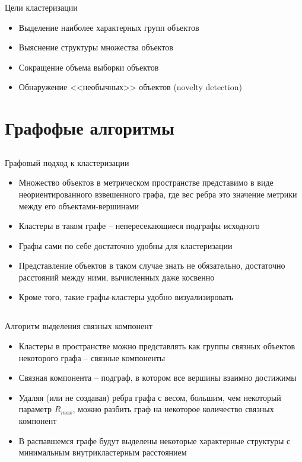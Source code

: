 \documentclass[compress,unicode]{beamer}
\begin{document}
\begin{frame}{Цели кластеризации}
\begin{itemize}
	\item Выделение наиболее характерных групп объектов
	\item Выяснение структуры множества объектов
	\item Сокращение объема выборки объектов
	\item Обнаружение <<необычных>> объектов (novelty detection)

\end{itemize}

\end{frame}



\section{Графофые алгоритмы}
\subsection{}
\begin{frame}{Графовый подход к кластеризации}
\begin{itemize}
	\item Множество объектов в метрическом пространстве представимо в виде неориентированного взвешенного графа, где вес ребра это значение метрики между его объектами-вершинами
	\item Кластеры в таком графе -- непересекающиеся подграфы исходного
	\item Графы сами по себе достаточно удобны для кластеризации
	\item Представление объектов в таком случае знать не обязательно, достаточно расстояний между ними, вычисленных даже косвенно
	\item Кроме того, такие графы-кластеры удобно визуализировать
%
\end{itemize}
\end{frame}

\subsection{}
\begin{frame}{Алгоритм выделения связных компонент}
\begin{itemize}
\item Кластеры в пространстве можно представлять как группы связных объектов некоторого графа -- связные компоненты
\item Связная компонента -- подграф, в котором все вершины взаимно достижимы
\item Удаляя (или не создавая) ребра графа с весом, большим, чем некоторый параметр $R_{max}$, можно разбить граф на некоторое количество связных компонент
\item В распавшемся графе будут выделены некоторые характерные структуры с минимальным внутрикластерным расстоянием
\end{itemize}
\end{frame}
\end{document}
